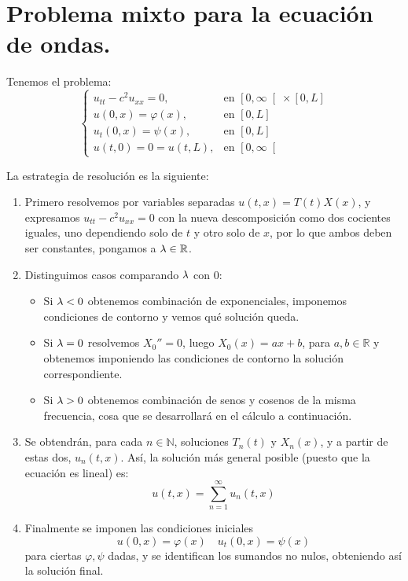 \documentclass[12pt]{book}
\begin{document}
    \section{Problema mixto para la ecuación de ondas.}

    Tenemos el problema:
    \begin{equation*}
        \left\{\begin{array}{ll}
                u_{tt} - c^2 u_{xx} = 0 , & \text{en\ } \left[0,\infty\right[\times [0,L] \\
                    u(0,x) = \varphi(x) , &\text{en\ } [0,L] \\
                    u_t(0,x) = \psi(x) , &\text{en\ } [0,L] \\
                    u(t,0) = 0 = u(t,L) , & \text{en\ } \left[0,\infty\right[
        \end{array}\right.
    \end{equation*}

    La estrategia de resolución es la siguiente:
    \begin{enumerate}
        \item Primero resolvemos por variables separadas $u(t,x) = T(t) X(x)$, y expresamos
        $u_{tt} - c^2 u_{xx} = 0$ con la nueva descomposición como dos cocientes iguales, 
        uno dependiendo solo de $t$ y otro solo de $x$, por lo que ambos deben ser constantes,
        pongamos a $\lambda \in \mathbb{R}$. 
        \item Distinguimos casos comparando $\lambda$ con $0$:
        \begin{itemize}
            \item Si $\lambda < 0$ obtenemos combinación de exponenciales, imponemos condiciones de contorno y vemos qué solución queda.
            \item Si $\lambda = 0$ resolvemos $X_0'' = 0$, luego $X_0(x) = ax+b$, para $a,b\in \mathbb{R}$ y obtenemos imponiendo las condiciones de contorno la solución correspondiente.
            \item Si $\lambda > 0$ obtenemos combinación de senos y cosenos de la misma frecuencia, cosa que se desarrollará en el cálculo a continuación.
        \end{itemize}
        \item Se obtendrán, para cada $n \in \mathbb{N}$, soluciones $T_n(t)$ y $X_n(x)$, y a partir de estas dos, $u_n(t,x)$. Así, la solución más general posible (puesto que la ecuación es lineal) es:
        \begin{equation*}
            u(t,x) = \sum_{n=1}^{\infty} u_n(t,x)
        \end{equation*} 
        \item Finalmente se imponen las condiciones iniciales $$u(0,x) = \varphi(x) \quad u_t(0,x) = \psi(x)$$
        para ciertas $\varphi, \psi$ dadas, y se identifican los sumandos no nulos, obteniendo así la solución final.
    \end{enumerate}
\end{document}
